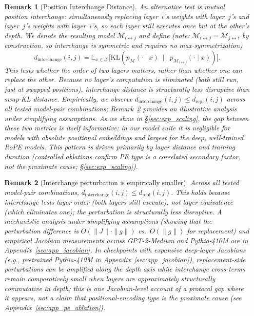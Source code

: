 \documentclass{article}
\newtheorem{remark}{Remark}
\begin{document}
\begin{remark}[Position Interchange Distance]
\label{rem:interchange}
An alternative test is \emph{mutual position interchange}: simultaneously replacing layer~$i$'s weights with layer~$j$'s \emph{and} layer~$j$'s weights with layer~$i$'s, so each layer still executes once but at the other's depth. We denote the resulting model $\mathcal{M}_{i \leftrightarrow j}$ and define (note: $\mathcal{M}_{i \leftrightarrow j} = \mathcal{M}_{j \leftrightarrow i}$ by construction, so interchange is symmetric and requires no max-symmetrization)
\begin{equation}
    d_{\text{interchange}}(i, j) = \mathbb{E}_{x \in \mathcal{X}}\!\big[\text{KL}\!\left(p_\mathcal{M}(\cdot \mid x) \;\|\; p_{\mathcal{M}_{i \leftrightarrow j}}(\cdot \mid x)\right)\big].
\end{equation}
This tests whether the \emph{order} of two layers matters, rather than whether one can \emph{replace} the other. Because no layer's computation is eliminated (both still run, just at swapped positions), interchange distance is structurally less disruptive than swap-KL distance. Empirically, we observe $d_{\text{interchange}}(i,j) \leq d_{\text{repl}}(i,j)$ across all tested model-pair combinations; Remark~\ref{rem:interchange_order} provides an illustrative analysis under simplifying assumptions. As we show in \S\ref{sec:exp_scaling}, the gap between these two metrics is itself informative: in our model suite it is negligible for models with absolute positional embeddings and largest for the deep, well-trained RoPE models. This pattern is driven primarily by layer distance and training duration (controlled ablations confirm PE type is a correlated secondary factor, not the proximate cause; \S\ref{sec:exp_scaling}).
\end{remark}

\begin{remark}[Interchange perturbation is empirically smaller]
\label{rem:interchange_order}
Across all tested model-pair combinations, $d_{\text{interchange}}(i,j) \leq d_{\text{repl}}(i,j)$. This holds because interchange tests layer \emph{order} (both layers still execute), not layer \emph{equivalence} (which eliminates one); the perturbation is structurally less disruptive. A mechanistic analysis under simplifying assumptions (showing that the perturbation difference is $O(\|J\|\cdot\|g\|)$ vs.\ $O(\|g\|)$ for replacement) and empirical Jacobian measurements across GPT-2-Medium and Pythia-410M are in Appendix~\ref{sec:app_jacobian}. In checkpoints with expansive deep-layer Jacobians (e.g., pretrained Pythia-410M in Appendix~\ref{sec:app_jacobian}), replacement-side perturbations can be amplified along the depth axis while interchange cross-terms remain comparatively small when layers are approximately structurally commutative in depth; this is one Jacobian-level account of a protocol gap \emph{where it appears}, not a claim that positional-encoding \emph{type} is the proximate cause (see Appendix~\ref{sec:app_pe_ablation}).
\end{remark}
\end{document}
